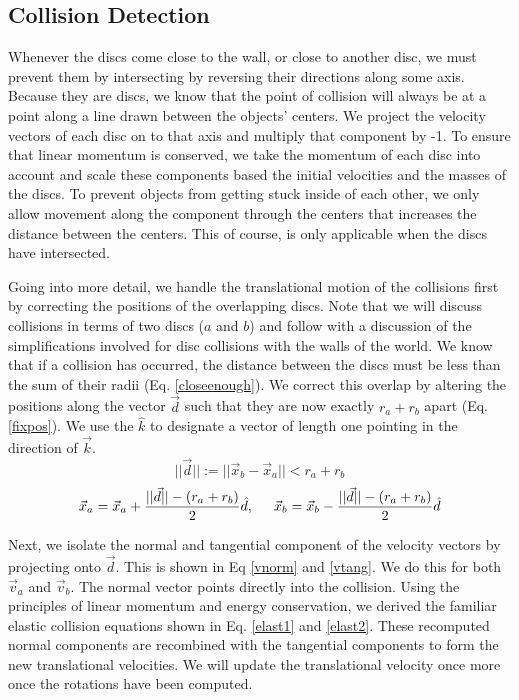 \documentclass[pdftext,twoside,10pt]{article}
\begin{document}
\subsection{Collision Detection}
Whenever the discs come close to the wall, or close to another disc, we must prevent them by intersecting by reversing their directions along some axis. Because they are discs, we know that the point of collision will always be at a point along a line drawn between the objects' centers. We project the velocity vectors of each disc on to that axis and multiply that component by -1. To ensure that linear momentum is conserved, we take the momentum of each disc into account and scale these components based the initial velocities and the masses of the discs. To prevent objects from getting stuck inside of each other, we only allow movement along the component through the centers that increases the distance between the centers. This of course, is only applicable when the discs have intersected. 

Going into more detail, we handle the translational motion of the collisions first by correcting the positions of the overlapping discs. Note that we will discuss collisions in terms of two discs ($a$ and $b$) and follow with a discussion of the simplifications involved for disc collisions with the walls of the world. We know that if a collision has occurred, the distance between the discs must be less than the sum of their radii (Eq. \ref{closeenough}). We correct this overlap by altering the positions along the vector $\vec{d}$ such that they are now exactly $r_a + r_b$ apart (Eq. \ref{fixpos}). We use the $\hat{k}$ to designate a vector of length one pointing in the direction of $\vec{k}$.
\begin{equation}
 ||\vec{d}|| := ||\vec{x}_b - \vec{x}_a || < r_a + r_b
 \label{closeenough}
\end{equation}
\begin{equation}
 \vec{x}_a = \vec{x}_a + \frac{||\vec{d}|| - (r_a + r_b)}{2}\hat{d}, \hspace{.5cm}
 \vec{x}_b = \vec{x}_b - \frac{||\vec{d}|| - (r_a + r_b)}{2}\hat{d}
 \label{fixpos}
\end{equation}

Next, we isolate the normal and tangential component of the velocity vectors by projecting onto $\vec{d}$. This is shown in Eq \ref{vnorm} and \ref{vtang}. We do this for both $\vec{v}_a$ and $\vec{v}_b$. The normal vector points directly into the collision. Using the principles of linear momentum and energy conservation, we derived the familiar elastic collision equations shown in Eq. \ref{elast1} and \ref{elast2}. These recomputed normal components are recombined with the tangential components to form the new translational velocities. We will update the translational velocity once more once the rotations have been computed.
\end{document}
